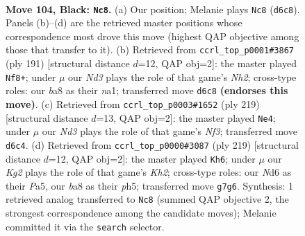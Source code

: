 \documentclass[11pt]{article}
\begin{document}
\clearpage

\begin{figure}[p]\centering
\begin{subfigure}{0.46\textwidth}\centering
\resizebox{\linewidth}{!}{%
\newchessgame
\chessboard[
  setfen={B7/P5k1/3n4/6P1/8/6KP/2P5/8 b - - 0 104},
  showmover=false,
  pgfstyle=straightmove, color=movearrow, markmove={d6-c8}
]}
\caption{}
\end{subfigure}\hfill
\begin{subfigure}{0.46\textwidth}\centering
\resizebox{\linewidth}{!}{%
\newchessgame
\chessboard[
  setfen={2k5/5P1n/2P1K3/8/8/8/p7/N7 b - - 8 96},
  showmover=false,
  pgfstyle=straightmove, color=movearrow, markmove={h7-f8}
]}
\caption{}
\end{subfigure}
\\[4pt]
\begin{subfigure}{0.46\textwidth}\centering
\resizebox{\linewidth}{!}{%
\newchessgame
\chessboard[
  setfen={8/8/4Bn2/2k5/p7/P1P5/2K5/8 b - - 3 110},
  showmover=false,
  pgfstyle=straightmove, color=movearrow, markmove={f6-e4}
]}
\caption{}
\end{subfigure}\hfill
\begin{subfigure}{0.46\textwidth}\centering
\resizebox{\linewidth}{!}{%
\newchessgame
\chessboard[
  setfen={8/7k/3p4/p6P/2P4P/3K4/8/8 b - - 3 110},
  showmover=false,
  pgfstyle=straightmove, color=movearrow, markmove={h7-h6}
]}
\caption{}
\end{subfigure}
\caption{\textbf{Move 104, Black: \texttt{Nc8}.} (a) Our position; Melanie plays \texttt{Nc8} (\texttt{d6c8}). Panels (b)--(d) are the retrieved master positions whose correspondence most drove this move (highest QAP objective among those that transfer to it). (b) Retrieved from \texttt{ccrl\_top\_p0001\#3867} (ply 191) [structural distance $d$=12, QAP obj=2]: the master played \texttt{Nf8+}; under $\mu$ our \emph{Nd3} plays the role of that game's \emph{Nh2}; cross-type roles: our \emph{b}a8 as their \emph{n}a1; transferred move \texttt{d6c8} \textbf{(endorses this move)}. (c) Retrieved from \texttt{ccrl\_top\_p0003\#1652} (ply 219) [structural distance $d$=13, QAP obj=2]: the master played \texttt{Ne4}; under $\mu$ our \emph{Nd3} plays the role of that game's \emph{Nf3}; transferred move \texttt{d6c4}. (d) Retrieved from \texttt{ccrl\_top\_p0000\#3087} (ply 219) [structural distance $d$=12, QAP obj=2]: the master played \texttt{Kh6}; under $\mu$ our \emph{Kg2} plays the role of that game's \emph{Kh2}; cross-type roles: our \emph{N}d6 as their \emph{P}a5, our \emph{b}a8 as their \emph{p}h5; transferred move \texttt{g7g6}. Synthesis: 1 retrieved analog transferred to \texttt{Nc8} (summed QAP objective 2, the strongest correspondence among the candidate moves); Melanie committed it via the \texttt{search} selector.}
\label{fig:thought-m207}
\end{figure}
\end{document}
